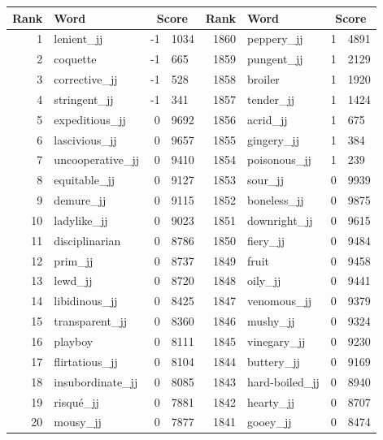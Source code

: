 \begin{table}[tbp]
    \begin{tabular}{| rlr@{.}l | rlr@{.}l |}
    \hline
    \textbf{Rank} & \textbf{Word} & \multicolumn{2}{c|}{\textbf{Score}} & \textbf{Rank} & \textbf{Word} & \multicolumn{2}{c|}{\textbf{Score}} \\
    \hline
    1 & lenient\_jj & -1 & 1034    &    1860 & peppery\_jj & 1 & 4891 \\
    2 & coquette & -1 & 665    &    1859 & pungent\_jj & 1 & 2129 \\
    3 & corrective\_jj & -1 & 528    &    1858 & broiler & 1 & 1920 \\
    4 & stringent\_jj & -1 & 341    &    1857 & tender\_jj & 1 & 1424 \\
    5 & expeditious\_jj & 0 & 9692    &    1856 & acrid\_jj & 1 & 675 \\
    6 & lascivious\_jj & 0 & 9657    &    1855 & gingery\_jj & 1 & 384 \\
    7 & uncooperative\_jj & 0 & 9410    &    1854 & poisonous\_jj & 1 & 239 \\
    8 & equitable\_jj & 0 & 9127    &    1853 & sour\_jj & 0 & 9939 \\
    9 & demure\_jj & 0 & 9115    &    1852 & boneless\_jj & 0 & 9875 \\
    10 & ladylike\_jj & 0 & 9023    &    1851 & downright\_jj & 0 & 9615 \\
    11 & disciplinarian & 0 & 8786    &    1850 & fiery\_jj & 0 & 9484 \\
    12 & prim\_jj & 0 & 8737    &    1849 & fruit & 0 & 9458 \\
    13 & lewd\_jj & 0 & 8720    &    1848 & oily\_jj & 0 & 9441 \\
    14 & libidinous\_jj & 0 & 8425    &    1847 & venomous\_jj & 0 & 9379 \\
    15 & transparent\_jj & 0 & 8360    &    1846 & mushy\_jj & 0 & 9324 \\
    16 & playboy & 0 & 8111    &    1845 & vinegary\_jj & 0 & 9230 \\
    17 & flirtatious\_jj & 0 & 8104    &    1844 & buttery\_jj & 0 & 9169 \\
    18 & insubordinate\_jj & 0 & 8085    &    1843 & hard-boiled\_jj & 0 & 8940 \\
    19 & risqué\_jj & 0 & 7881    &    1842 & hearty\_jj & 0 & 8707 \\
    20 & mousy\_jj & 0 & 7877    &    1841 & gooey\_jj & 0 & 8474 \\

\end{tabular}
\end{table}
